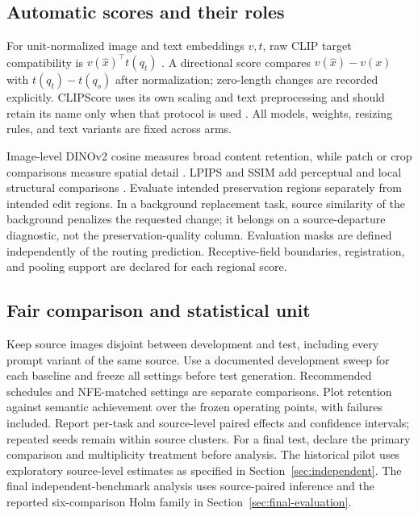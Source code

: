 \documentclass[conference]{IEEEtran}
\begin{document}


\subsection{Automatic scores and their roles}
For unit-normalized image and text embeddings $v,t$, raw CLIP target compatibility is $v(\widehat x)^\top t(q_t)$ \cite{radford2021clip}. A directional score compares $v(\widehat x)-v(x)$ with $t(q_t)-t(q_s)$ after normalization; zero-length changes are recorded explicitly. CLIPScore uses its own scaling and text preprocessing and should retain its name only when that protocol is used \cite{hessel2021clipscore}. All models, weights, resizing rules, and text variants are fixed across arms.

Image-level DINOv2 cosine measures broad content retention, while patch or crop comparisons measure spatial detail \cite{caron2021dino,oquab2024dinov2}. LPIPS and SSIM add perceptual and local structural comparisons \cite{zhang2018lpips,wang2004ssim}. Evaluate intended preservation regions separately from intended edit regions. In a background replacement task, source similarity of the background penalizes the requested change; it belongs on a source-departure diagnostic, not the preservation-quality column. Evaluation masks are defined independently of the routing prediction. Receptive-field boundaries, registration, and pooling support are declared for each regional score.

\subsection{Fair comparison and statistical unit}
Keep source images disjoint between development and test, including every prompt variant of the same source. Use a documented development sweep for each baseline and freeze all settings before test generation. Recommended schedules and NFE-matched settings are separate comparisons. Plot retention against semantic achievement over the frozen operating points, with failures included. Report per-task and source-level paired effects and confidence intervals; repeated seeds remain within source clusters. For a final test, declare the primary comparison and multiplicity treatment before analysis. The historical pilot uses exploratory source-level estimates as specified in Section~\ref{sec:independent}. The final independent-benchmark analysis uses source-paired inference and the reported six-comparison Holm family in Section~\ref{sec:final-evaluation}.
\end{document}
